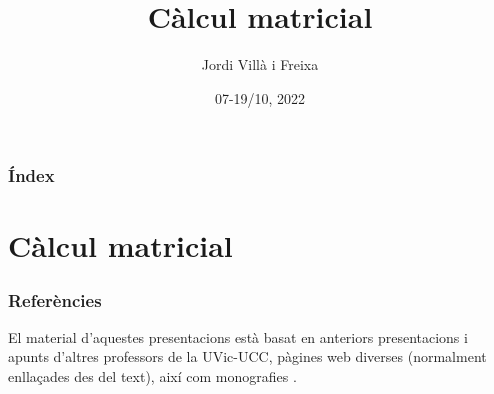 \documentclass{beamer}
\title[Matrius]{Càlcul matricial} %
\author{Jordi Villà i Freixa} %
\institute[FCTE] %
{
Universitat de Vic - Universitat Central de Catalunya \\
Grau en Multimèdia. Aplicacions i Videojocs\\ %
\medskip
\textit{jordi.villa@uvic.cat} %
}
\date{07-19/10, 2022}
\begin{document}
\begin{frame}
\titlepage %
\end{frame}

\begin{frame}
\frametitle{Índex} %
\tableofcontents %
\end{frame}


\section{Càlcul matricial} %

\begin{frame}
\frametitle{Referències}
El material d'aquestes presentacions està basat en anteriors presentacions i apunts d'altres professors \cite{jlgarcia,mcorbera,mcalle} de la UVic-UCC, pàgines web diverses (normalment enllaçades des del text), així com monografies \cite{vanverth,schaum,riley}.
\end{frame}
\end{document}
